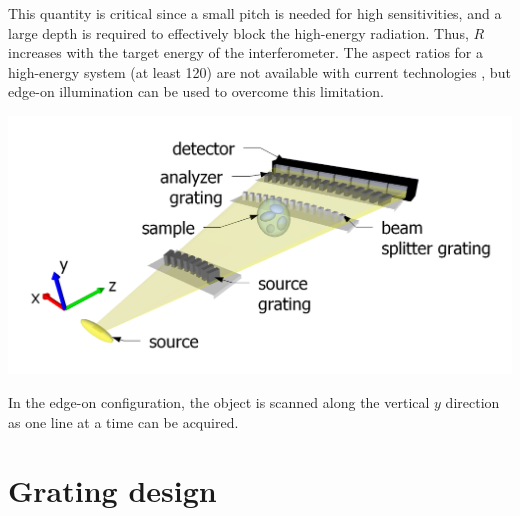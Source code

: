\documentclass[a0,portrait]{a0poster}
\newenvironment{spacedcenter}{\vspace{2cm}\begin{center}}
        {\end{center}\vspace{2cm}\par}
\begin{document}
\begin{multicols}{2}
This quantity is critical since a small pitch is needed for high
sensitivities, and a large depth is required to effectively block the
high-energy radiation. Thus, $R$ increases with the target energy of the
interferometer.
%
The aspect ratios for a high-energy system (at least \num{120}) are not available with current
technologies \cite{David2007}, but edge-on illumination can be used to overcome this
limitation.
\begin{spacedcenter}
    \includegraphics[width=0.6\linewidth]{hDPC_setup.png}
\end{spacedcenter}
In the edge-on configuration, the object is scanned along the vertical
$y$ direction as one line at a time can be acquired.  


\section*{Grating design}


\end{multicols}
\end{document}
